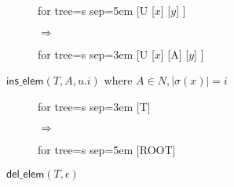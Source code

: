 \begin{figure}[H]
	\centering
	\begin{subfigure}{0.4\textwidth}
		\centering
		\begin{adjustbox}{valign=c, max width=\textwidth}
			\begin{forest}
			for tree={s sep=5em}
			[U
				[$x$]
				[$y$]
			]
			\end{forest}
		\end{adjustbox}
		\caption{}
	\end{subfigure}
	\begin{subfigure}{0.1\textwidth}
		\centering
		\huge{$\Rightarrow$}
	\end{subfigure}
	\begin{subfigure}{0.4\textwidth}
		\centering
		\begin{adjustbox}{valign=c, max width=\textwidth}
			\begin{forest}
			for tree={s sep=3em}
			[U
				[$x$]
				[A]
				[$y$]
			]
			\end{forest}
		\end{adjustbox}
		\caption{}
	\end{subfigure}
	\caption{$\textsf{ins\_elem}(T, A, u.i)$ where $A \in N, |\sigma(x)| = i$}
	\label{fig:sch:op:insElem}
\end{figure}


\begin{figure}[H]
	\centering
	\begin{subfigure}{0.4\textwidth}
		\centering
		\begin{adjustbox}{valign=c, max width=\textwidth}
			\begin{forest}
			for tree={s sep=3em}
			[T]
			\end{forest}
		\end{adjustbox}
		\caption{}
	\end{subfigure}
	\begin{subfigure}{0.1\textwidth}
		\centering
		\huge{$\Rightarrow$}
	\end{subfigure}
	\begin{subfigure}{0.4\textwidth}
		\centering
		\begin{adjustbox}{valign=c, max width=\textwidth}
			\begin{forest}
			for tree={s sep=5em}
			[ROOT]
			\end{forest}
		\end{adjustbox}
		\caption{}
	\end{subfigure}
	\caption{$\textsf{del\_elem}(T, \epsilon)$}
	\label{fig:sch:op:insElem}
\end{figure}


